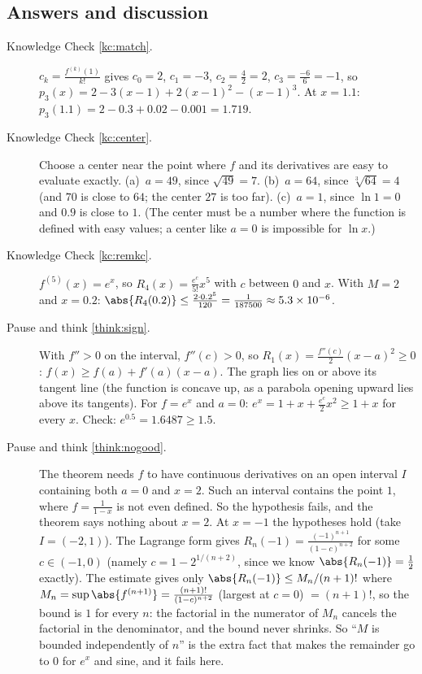 \documentclass[11pt]{article}
\begin{document}
\subsection*{Answers and discussion}

\begin{description}
  \item[Knowledge Check \ref{kc:match}.] $c_k=\frac{f^{(k)}(1)}{k!}$ gives $c_0=2$, $c_1=-3$, $c_2=\frac42=2$, $c_3=\frac{-6}6=-1$, so $p_3(x)=2-3(x-1)+2(x-1)^2-(x-1)^3$. At $x=1.1$: $p_3(1.1)=2-0.3+0.02-0.001=1.719$.
  \item[Knowledge Check \ref{kc:center}.] Choose a center near the point where $f$ and its derivatives are easy to evaluate exactly. (a)~$a=49$, since $\sqrt{49}=7$. (b)~$a=64$, since $\sqrt[3]{64}=4$ (and $70$ is close to $64$; the center $27$ is too far). (c)~$a=1$, since $\ln1=0$ and $0.9$ is close to $1$. (The center must be a number where the function is defined with easy values; a center like $a=0$ is impossible for $\ln x$.)
  \item[Knowledge Check \ref{kc:remkc}.] $f^{(5)}(x)=e^x$, so $R_4(x)=\frac{e^c}{5!}x^5$ with $c$ between $0$ and $x$. With $M=2$ and $x=0.2$: $\abs{R_4(0.2)}\le\frac{2\cdot0.2^5}{120}=\frac1{187500}\approx5.3\times10^{-6}$.
  \item[Pause and think \ref{think:sign}.] With $f''>0$ on the interval, $f''(c)>0$, so $R_1(x)=\frac{f''(c)}2(x-a)^2\ge0$: $f(x)\ge f(a)+f'(a)(x-a)$. The graph lies on or above its tangent line (the function is concave up, as a parabola opening upward lies above its tangents). For $f=e^x$ and $a=0$: $e^x=1+x+\frac{e^c}2x^2\ge1+x$ for every $x$. Check: $e^{0.5}=1.6487\ge1.5$.
  \item[Pause and think \ref{think:nogood}.] The theorem needs $f$ to have continuous derivatives on an open interval $I$ containing both $a=0$ and $x=2$. Such an interval contains the point $1$, where $f=\frac1{1-x}$ is not even defined. So the hypothesis fails, and the theorem says nothing about $x=2$. At $x=-1$ the hypotheses hold (take $I=(-2,1)$). The Lagrange form gives $R_n(-1)=\frac{(-1)^{n+1}}{(1-c)^{n+2}}$ for some $c\in(-1,0)$ (namely $c=1-2^{1/(n+2)}$, since we know $\abs{R_n(-1)}=\frac12$ exactly). The estimate gives only $\abs{R_n(-1)}\le M_n/(n+1)!$ where $M_n=\sup\abs{f^{(n+1)}}=\frac{(n+1)!}{(1-c)^{n+2}}$ (largest at $c=0$) $=(n+1)!$, so the bound is $1$ for every $n$: the factorial in the numerator of $M_n$ cancels the factorial in the denominator, and the bound never shrinks. So ``$M$ is bounded independently of $n$'' is the extra fact that makes the remainder go to $0$ for $e^x$ and sine, and it fails here.

\end{description}
\end{document}
